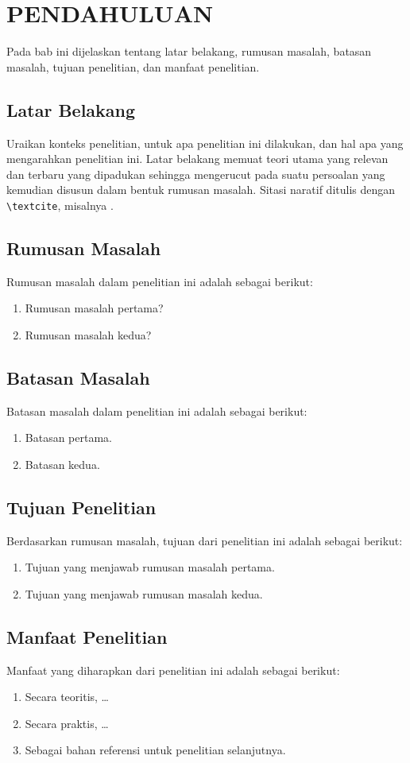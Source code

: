 \chapter{PENDAHULUAN}
Pada bab ini dijelaskan tentang latar belakang, rumusan masalah, batasan masalah, tujuan penelitian, dan manfaat penelitian.

\section{Latar Belakang}
Uraikan konteks penelitian, untuk apa penelitian ini dilakukan, dan hal apa yang mengarahkan penelitian ini. Latar belakang memuat teori utama yang relevan dan terbaru \parencite{contoh2024artikel} yang dipadukan sehingga mengerucut pada suatu persoalan yang kemudian disusun dalam bentuk rumusan masalah. Sitasi naratif ditulis dengan \texttt{\textbackslash textcite}, misalnya \textcite{penulis2015buku}.

\section{Rumusan Masalah}
Rumusan masalah dalam penelitian ini adalah sebagai berikut:
\begin{enumerate}
  \item Rumusan masalah pertama?
  \item Rumusan masalah kedua?
\end{enumerate}

\section{Batasan Masalah}
Batasan masalah dalam penelitian ini adalah sebagai berikut:
\begin{enumerate}
  \item Batasan pertama.
  \item Batasan kedua.
\end{enumerate}

\section{Tujuan Penelitian}
Berdasarkan rumusan masalah, tujuan dari penelitian ini adalah sebagai berikut:
\begin{enumerate}
  \item Tujuan yang menjawab rumusan masalah pertama.
  \item Tujuan yang menjawab rumusan masalah kedua.
\end{enumerate}

\section{Manfaat Penelitian}
Manfaat yang diharapkan dari penelitian ini adalah sebagai berikut:
\begin{enumerate}
  \item Secara teoritis, \dots
  \item Secara praktis, \dots
  \item Sebagai bahan referensi untuk penelitian selanjutnya.
\end{enumerate}
